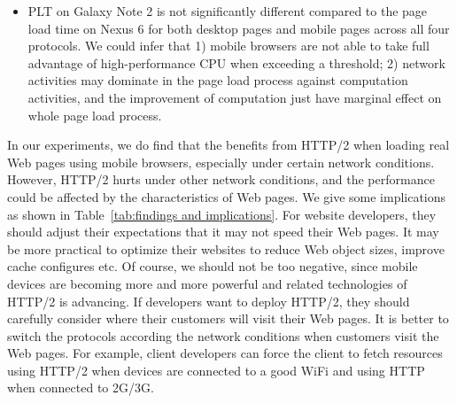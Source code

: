 \begin{itemize}
    \item{PLT on Galaxy Note 2 is not significantly different compared to the page load time on Nexus 6 for both desktop pages and mobile pages across all four protocols. We could infer that 1) mobile browsers are not able to take full advantage of high-performance CPU when exceeding a threshold; 2) network activities may dominate in the page load process against computation activities, and the improvement of computation just have marginal effect on whole page load process.}
        
 \end{itemize}
 
 In our experiments, we do find that the benefits from HTTP/2 when loading real Web pages using mobile browsers, especially under certain network conditions. However, HTTP/2 hurts under other network conditions, and the performance could be affected by the characteristics of Web pages. We give some implications as shown in Table~\ref{tab:findings and implications}. For website developers, they should adjust their expectations that it may not speed their Web pages. It may be more practical to optimize their websites to reduce Web object sizes, improve cache configures etc. Of course, we should not be too negative, since mobile devices are becoming more and more powerful and related technologies of HTTP/2 is advancing. If developers want to deploy HTTP/2, they should carefully consider where their customers will visit their Web pages. It is better to switch the protocols according the network conditions when customers visit the Web pages. For example, client developers can force the client to fetch resources using HTTP/2 when devices are connected to a good WiFi and using HTTP when   connected to 2G/3G.
 
 
 

